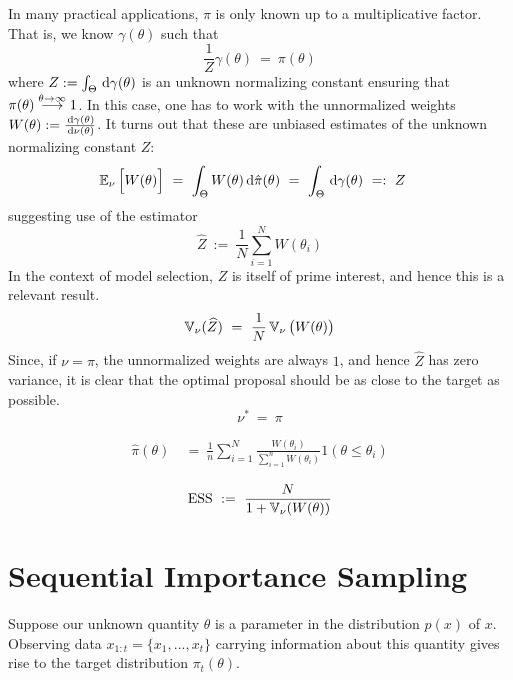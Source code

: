 In many practical applications, $\pi$ is only known up to a multiplicative factor. That is, we know $\gamma(\theta)$ such that
\begin{equation*}
\frac{1}{Z} \gamma(\theta) ~ = ~ \pi(\theta)
\end{equation*}
where $Z := \int_\Theta \, \textrm{d} \gamma(\theta)$ is an unknown normalizing constant ensuring that $\pi(\theta) \tendsto{\theta \to \infty} 1$. In this case, one has to work with the unnormalized weights $W(\theta) := \frac{\, \textrm{d} \gamma(\theta)}{\, \textrm{d} \nu(\theta)}$. It turns out that these are unbiased estimates of the unknown normalizing constant $Z$:
\begin{align*}
\operatorname{\mathbb{E}}_\nu \Big[ W(\theta) \Big] ~ &= ~ \int_\Theta W(\theta) \, \textrm{d} \hat{\pi}(\theta) ~ = ~ \int_\Theta \, \textrm{d} \gamma(\theta) ~ =: ~ Z
\end{align*}
suggesting use of the estimator
\begin{equation*}
\widehat{Z} ~ := ~ \frac{1}{N} \sum_{i=1}^N W(\theta_i)
\end{equation*}
In the context of model selection, $Z$ is itself of prime interest, and hence this is a relevant result.
\begin{equation*}
\operatorname{\mathbb{V}}_\nu(\widehat{Z}) ~ = ~ \frac{1}{N} \operatorname{\mathbb{V}}_\nu \big( W(\theta) \big)
\end{equation*}
Since, if $\nu = \pi$, the unnormalized weights are always $1$, and hence $\widehat{Z}$ has zero variance, it is clear that the optimal proposal should be as close to the target as possible.
\begin{equation*}
\nu^* ~ = ~ \pi
\end{equation*}

\begin{align*}
\hat{\pi}(\theta) ~ &= ~ \frac{1}{n} \sum_{i=1}^N \frac{W(\theta_i)}{\sum_{i=1}^n W(\theta_i)} 1(\theta \leq \theta_i)
\end{align*}

\begin{equation*}
\textrm{ESS} ~ := ~ \frac{N}{1 + \operatorname{\mathbb{V}}_\nu(W(\theta))}
\end{equation*}


\section{Sequential Importance Sampling}

Suppose our unknown quantity $\theta$ is a parameter in the distribution $p(x)$ of $x$. Observing data $x_{1:t} = \{x_1,...,x_t\}$ carrying information about this quantity gives rise to the target distribution $\pi_t(\theta)$.


